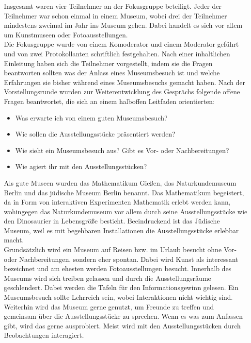 \documentclass[runningheads,a4paper]{llncs}
\begin{document}
Insgesamt waren vier Teilnehmer an der Fokusgruppe beteiligt. Jeder der Teilnehmer war schon einmal in einem Museum, wobei drei der Teilnehmer mindestens zweimal im Jahr ins Museum gehen. Dabei handelt es sich vor allem um Kunstmuseen oder Fotoausstellungen.\\

Die Fokusgruppe wurde von einem Komoderator und einem Moderator geführt und von zwei Protokollanten schriftlich festgehalten. Nach einer inhaltlichen Einleitung haben sich die Teilnehmer vorgestellt, indem sie die Fragen beantworten sollten was der Anlass eines Museumsbesuch ist und welche Erfahrungen sie bisher während eines Museumsbesuchs gemacht haben. Nach der Vorstellungsrunde wurden zur Weiterentwicklung des Gesprächs folgende offene Fragen beantwortet, die sich an einem halboffen Leitfaden orientierten:
\begin{itemize}
	\item Was erwarte ich von einem guten Museumsbesuch?
	\item Wie sollen die Ausstellungsstücke präsentiert werden?
	\item Wie sieht ein Museumsbesuch aus? Gibt es Vor- oder Nachbereitungen?
	\item Wie agiert ihr mit den Ausstellungsstücken?
\end{itemize}

Als gute Museen wurden das Mathematikum Gießen, das Naturkundemuseum Berlin und das jüdische Museum Berlin benannt. Das Mathematikum begeistert, da in Form von interaktiven Experimenten Mathematik erlebt werden kann, wohingegen das Naturkundemuseum vor allem durch seine Ausstellungsstücke wie den Dinosaurier in Lebensgröße besticht. Beeindruckend ist das Jüdische Museum, weil es mit begehbaren Installationen die Ausstellungsstücke erlebbar macht.\\

Grundsätzlich wird ein Museum auf Reisen bzw. im Urlaub besucht ohne Vor- oder Nachbereitungen, sondern eher spontan. Dabei wird Kunst als interessant bezeichnet und am ehesten werden Fotoausstellungen besucht. Innerhalb des Museums wird sich treiben gelassen und durch die Ausstellungsräume geschlendert. Dabei werden die Tafeln für den Informationsgewinn gelesen. Ein Museumsbesuch sollte Lehrreich sein, wobei Interaktionen nicht wichtig sind. Weiterhin wird das Museum gerne genutzt, um  Freunde zu treffen und gemeinsam über die Ausstellungsstücke zu sprechen. Wenn es was zum Anfassen gibt, wird das gerne ausprobiert. Meist wird mit den Ausstellungsstücken durch Beobachtungen interagiert.\\
\end{document}
